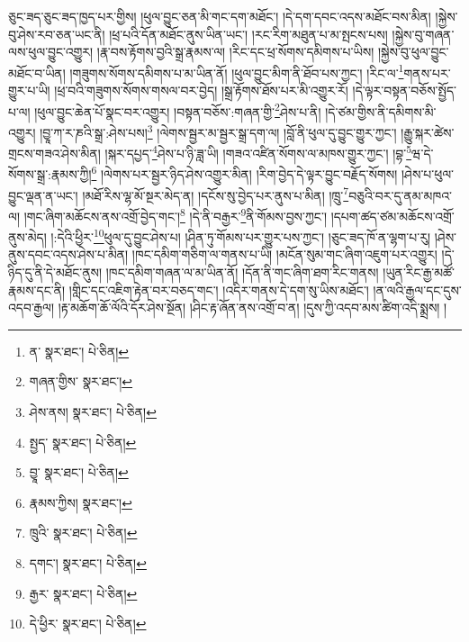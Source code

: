 ཅུང་ཟད་ཅུང་ཟད་ཁྱད་པར་གྱིས། །ཕུལ་བྱུང་ཅན་མི་གང་དག་མཐོང་། །དེ་དག་དབང་འདས་མཐོང་བས་མིན། །སྐྱེས་བུ་ཤེས་རབ་ཅན་ཡང་ནི། །ཕྲ་པའི་དོན་མཐོང་ནུས་ཡིན་ཡང་། །རང་རིག་མཐུན་པ་མ་སྤངས་པས། །སྐྱེས་བུ་གཞན་ལས་ཕུལ་བྱུང་འགྱུར། །རྣ་བས་རྟོགས་བྱའི་སྒྲ་རྣམས་ལ། །རིང་དང་ཕྲ་སོགས་དམིགས་པ་ཡིས། །སྐྱེས་བུ་ཕུལ་བྱུང་མཐོང་བ་ཡིན། །གཟུགས་སོགས་དམིགས་པ་མ་ཡིན་ནོ། །ཕུལ་བྱུང་མིག་ནི་ཐོབ་པས་ཀྱང་། །རིང་ལ་\footnote{ན་  སྣར་ཐང་།  པེ་ཅིན། }གནས་པར་གྱུར་པ་ཡི། །ཕྲ་བའི་གཟུགས་སོགས་གསལ་བར་བྱེད། །སྒྲ་རྟོགས་ཐོས་པར་མི་འགྱུར་རོ། །དེ་ལྟར་བསྟན་བཅོས་སྤྱོད་པ་ལ། །ཕུལ་བྱུང་ཆེན་པོ་སྣང་བར་འགྱུར། །བསྟན་བཅོས་:གཞན་གྱི་\footnote{གཞན་གྱིས་  སྣར་ཐང་། }ཤེས་པ་ནི། །དེ་ཙམ་གྱིས་ནི་དམིགས་མི་འགྱུར། །བྱཱ་ཀ་ར་ཎའི་སྒྲ་:ཤེས་པས།\footnote{ཤེས་ནས།  སྣར་ཐང་།  པེ་ཅིན། } །ལེགས་སྦྱར་མ་སྦྱར་སྒྲ་དག་ལ། །བློ་ནི་ཕུལ་དུ་བྱུང་གྱུར་ཀྱང་། །རྒྱུ་སྐར་ཚེས་གྲངས་གཟའ་ཤེས་མིན། །སྐར་དཔྱད་\footnote{སྤྱད་  སྣར་ཐང་།  པེ་ཅིན། }ཤེས་པ་ཉི་ཟླ་ཡི། །གཟའ་འཛིན་སོགས་ལ་མཁས་གྱུར་ཀྱང་། །བྷ་\footnote{བྱཱ་  སྣར་ཐང་།  པེ་ཅིན། }ཝ་དེ་སོགས་སྒྲ་:རྣམས་ཀྱི།\footnote{རྣམས་ཀྱིས།  སྣར་ཐང་། } །ལེགས་པར་སྦྱར་ཉིད་ཤེས་འགྱུར་མིན། །རིག་བྱེད་དེ་ལྟར་བྱུང་བརྗོད་སོགས། །ཤེས་པ་ཕུལ་བྱུང་ལྡན་ན་ཡང་། །མཐོ་རིས་ལྷ་མོ་སྔར་མེད་ན། །དངོས་སུ་བྱེད་པར་ནུས་པ་མིན། །ཁྲུ་\footnote{ཁྲུའི་  སྣར་ཐང་།  པེ་ཅིན། }བཅུའི་བར་དུ་ནམ་མཁའ་ལ། །གང་ཞིག་མཆོངས་ནས་འགྲོ་བྱེད་གང་།\footnote{དགང་།  སྣར་ཐང་།  པེ་ཅིན། } །དེ་ནི་བརྒྱར་\footnote{རྒྱར་  སྣར་ཐང་།  པེ་ཅིན། }ནི་གོམས་བྱས་ཀྱང་། །དཔག་ཚད་ཙམ་མཆོངས་འགྲོ་ནུས་མེད། །:དེའི་ཕྱིར་\footnote{དེ་ཕྱིར་  སྣར་ཐང་།  པེ་ཅིན། }ཕུལ་དུ་བྱུང་ཤེས་པ། །ཤིན་ཏུ་གོམས་པར་གྱུར་པས་ཀྱང་། །ཅུང་ཟད་ཁོ་ན་ལྷག་པ་རུ། །ཤེས་ནུས་དབང་འདས་ཤེས་པ་མིན། །ཁང་དམིག་གཅིག་ལ་གནས་པ་ཡི། །མངོན་སུམ་གང་ཞིག་འཇུག་པར་འགྱུར། །དེ་ཉིད་དུ་ནི་དེ་མཐོང་ནུས། །ཁང་དམིག་གཞན་ལ་མ་ཡིན་ནོ། །དོན་ནི་གང་ཞིག་ཐག་རིང་གནས། །ཡུན་རིང་རྒྱ་མཚོ་རྣམས་དང་ནི། །གླིང་དང་འཇིག་རྟེན་བར་བཅད་གང་། །འདིར་གནས་དེ་དག་སུ་ཡིས་མཐོང་། །ན་ལའི་རྒྱལ་དང་དུས་འདབ་རྒྱལ། །རྟ་མཆོག་ཆོ་ལོའི་དོར་ཤེས་སྔོན། །ཤིང་རྟ་ཞོན་ནས་འགྲོ་བ་ན། །དུས་ཀྱི་འདབ་མས་ཚིག་འདི་སྨྲས། །
